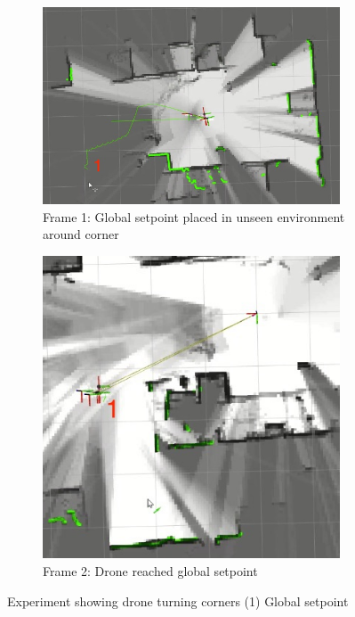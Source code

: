 \documentclass[capstone_report.tex]{subfiles}
\begin{document}
\begin{figure}[H]
    \centering
    \begin{subfigure}{0.5\textwidth}
        \centering
        \includegraphics[width=0.97\textwidth]{./imgs/turn_corners/an_frame_1.jpg}
        \caption{Frame 1: Global setpoint placed in unseen environment around corner}
        \label{fig:avoid_obs_1}
    \end{subfigure}%
    \begin{subfigure}{0.5\textwidth}
        \centering
        \includegraphics[width=0.97\textwidth]{./imgs/turn_corners/an_frame_2.jpg}
        \caption{Frame 2: Drone reached global setpoint}
        \label{fig:avoid_obs_2}
    \end{subfigure}
    \caption{Experiment showing drone turning corners (1) Global setpoint\label{fig:avoid_obs}}
\end{figure}
\end{document}
